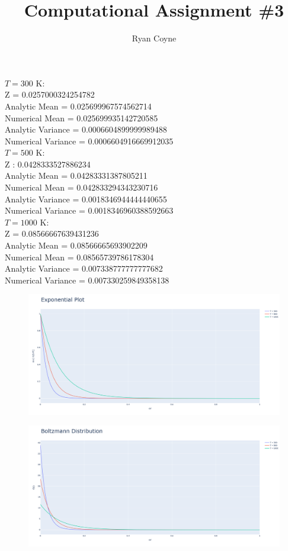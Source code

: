 \documentclass[12pt]{article}
\begin{document}
    \title{Computational Assignment \#3}
    \author{Ryan Coyne}
    \maketitle
    \noindent \(T = 300\) K:\\
    Z = 0.0257000324254782\\
    Analytic Mean = 0.025699967574562714\\
    Numerical Mean = 0.025699935142720585\\
    Analytic Variance = 0.0006604899999989488\\
    Numerical Variance = 0.0006604916669912035\\
    \(T = 500\) K:\\
    Z :  0.0428333527886234\\
    Analytic Mean = 0.04283331387805211\\
    Numerical Mean = 0.042833294343230716\\
    Analytic Variance = 0.0018346944444440655\\
    Numerical Variance = 0.0018346960388592663\\
    \(T = 1000\) K:\\
    Z = 0.08566667639431236\\
    Analytic Mean = 0.08566665693902209\\
    Numerical Mean = 0.08565739786178304\\
    Analytic Variance = 0.007338777777777682\\
    Numerical Variance = 0.007330259849358138\\
    \begin{figure}[H]
        \centering
        \includegraphics[width=\linewidth]{fig1.png}
    \end{figure}
    \begin{figure}
        \centering
        \includegraphics[width=\linewidth]{fig2.png}
    \end{figure}
\end{document}
